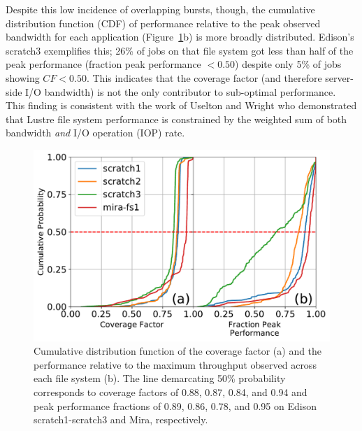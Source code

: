Despite this low incidence of overlapping bursts, though, the cumulative
distribution function (CDF) of performance relative to the peak observed
bandwidth for each application (Figure~\ref{fig:cdfs}b) is more broadly distributed.
Edison's scratch3 exemplifies this; 26\% of jobs on that file system got less than half of the peak performance (fraction peak performance $< 0.50$) despite only 5\% of jobs showing $\mathit{CF} < 0.50$.  This indicates that the coverage factor (and therefore server-side I/O bandwidth) is not the only contributor to sub-optimal performance.  
This finding is consistent with the work of Uselton and Wright\cite{Uselton2013} who demonstrated that Lustre file system performance is constrained by the weighted sum of both bandwidth \emph{and} I/O operation (IOP) rate.  

\begin{figure}[t]
    \centering
    \includegraphics[width=\columnwidth]{figs/cdf-both.pdf}
    \caption{Cumulative distribution function of the coverage factor (a) and the    performance relative to the maximum throughput observed across each file system (b).
    The line demarcating 50\% probability corresponds to coverage factors of 0.88, 0.87, 0.84, and 0.94 and peak performance fractions of 0.89, 0.86, 0.78, and 0.95 on Edison scratch1-scratch3 and Mira, respectively.}
    \label{fig:cdfs}
\end{figure}

